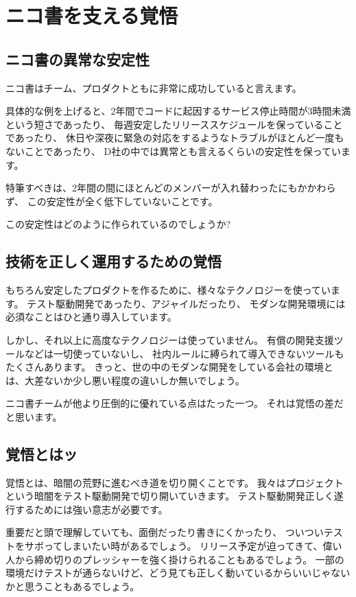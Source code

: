 \section{ニコ書を支える覚悟}

\subsection{ニコ書の異常な安定性}

ニコ書はチーム、プロダクトともに非常に成功していると言えます。

具体的な例を上げると、2年間でコードに起因するサービス停止時間が3時間未満という短さであったり、
毎週安定したリリーススケジュールを保っていることであったり、
休日や深夜に緊急の対応をするようなトラブルがほとんど一度もないことであったり、
D社の中では異常とも言えるくらいの安定性を保っています。

特筆すべきは、2年間の間にほとんどのメンバーが入れ替わったにもかかわらず、
この安定性が全く低下していないことです。

この安定性はどのように作られているのでしょうか?

\subsection{技術を正しく運用するための覚悟}

もちろん安定したプロダクトを作るために、様々なテクノロジーを使っています。
テスト駆動開発であったり、アジャイルだったり、
モダンな開発環境には必須なことはひと通り導入しています。

しかし、それ以上に高度なテクノロジーは使っていません。
有償の開発支援ツールなどは一切使っていないし、
社内ルールに縛られて導入できないツールもたくさんあります。
きっと、世の中のモダンな開発をしている会社の環境とは、大差ないか少し悪い程度の違いしか無いでしょう。

ニコ書チームが他より圧倒的に優れている点はたった一つ。
それは覚悟の差だと思います。

\subsection{覚悟とはッ}

覚悟とは、暗闇の荒野に進むべき道を切り開くことです。
我々はプロジェクトという暗闇をテスト駆動開発で切り開いていきます。
テスト駆動開発正しく遂行するためには強い意志が必要です。

重要だと頭で理解していても、面倒だったり書きにくかったり、
ついついテストをサボってしまいたい時があるでしょう。
リリース予定が迫ってきて、偉い人から締め切りのプレッシャーを強く掛けられることもあるでしょう。
一部の環境だけテストが通らないけど、どう見ても正しく動いているからいいじゃないかと思うこともあるでしょう。


